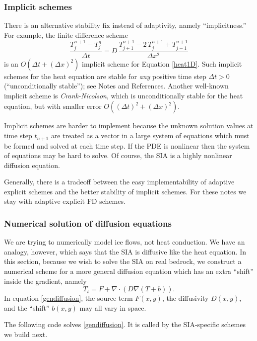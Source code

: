 \documentclass[letterpaper,final,12pt,reqno]{amsart}
\newcommand{\grad}{\nabla}
\newcommand{\Div}{\nabla\cdot}
\begin{document}
\subsubsection*{Implicit schemes}  There is an alternative stability fix instead of adaptivity, namely ``implicitness.''  For example, the finite difference scheme
\begin{equation}
  \frac{T_j^{n+1} - T_j^n}{\Delta t} = D\,\frac{T_{j+1}^{n+1} - 2\, T_j^{n+1} + T_{j-1}^{n+1}}{\Delta x^2} \label{implicit1D}
\end{equation}
is an $O(\Delta t + (\Delta x)^2)$ implicit scheme for Equation \eqref{heat1D}.  Such implicit schemes for the heat equation are stable for \emph{any} positive time step $\Delta t>0$ (``unconditionally stable''); see Notes and References.  Another well-known implicit scheme is \emph{Crank-Nicolson}, which is unconditionally stable for the heat equation, but with smaller error $O((\Delta t)^2 +(\Delta x)^2)$.

Implicit schemes are harder to implement because the unknown solution values at time step $t_{n+1}$ are treated as a vector in a large system of equations which must be formed and solved at each time step.  If the PDE is nonlinear then the system of equations may be hard to solve.  Of course, the SIA is a highly nonlinear diffusion equation.

Generally, there is a tradeoff between the easy implementability of adaptive explicit schemes and the better stability of implicit schemes.  For these notes we stay with adaptive explicit FD schemes.

\subsubsection*{Numerical solution of diffusion equations}  We are trying to numerically model ice flows, not heat conduction.  We have an analogy, however, which says that the SIA is diffusive like the heat equation.  In this section, because we wish to solve the SIA on real bedrock, we construct a numerical scheme for a more general diffusion equation which has an extra ``shift'' inside the gradient, namely
\begin{equation}
  T_t = F + \Div \left(D \grad (T + b)\right). \label{gendiffusion}
\end{equation}
In equation \eqref{gendiffusion}, the source term $F(x,y)$, the diffusivity $D(x,y)$, and the ``shift'' $b(x,y)$ may all vary in space.

The following code solves \eqref{gendiffusion}.  It is called by the SIA-specific schemes we build next.
\end{document}
